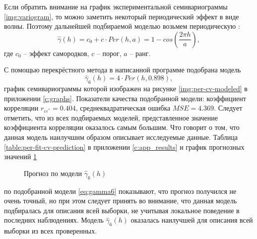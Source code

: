 Если обратить внимание на график экспериментальной семивариограммы \ref{img:variogram}, то можно заметить некоторый периодический эффект в виде волны. Поэтому дальнейшей подбираемой моделью возьмем периодическую \cite{pebesma2001gstat}:
\begin{equation}
\label{eq:per}
	\widehat{\gamma}(h) = c_0 + c \cdot Per(h, a) = 1 - cos(\frac{2 \pi h}{a}),
\end{equation}
где $ c_0 $ -- эффект самородков, $ c $ -- порог, $ a $ -- ранг.

С помощью перекрёстного метода в написанной программе подобрана модель
\begin{equation}
\label{eq:gamma6}
	\widehat{\gamma}_6(h) = 4 \cdot Per(h, 0.898),
\end{equation}
график семивариограммы которой изображен на рисунке \ref{img:per-cv-modeled} в приложении \ref{c:graphs}. Показатели качества подобранной модели: коэффициент корреляции $ r_{\varepsilon\varepsilon^{*}} = 0.404 $, среднеквадратическая ошибка $ MSE = 4.369 $. Следует отметить, что из всех подбираемых моделей, представленное значение коэффициента корреляции оказалось самым большим. Что говорит о том, что данная модель наилучшим образом описывает исследуемые данные. Таблица \ref{table:per-fit-cv-prediction} в приложении \ref{c:app_results} и график прогнозных значений \ref{img:per-cv-pred}
\begin{figure}[ht]
\caption{Прогноз по модели $ \widehat{\gamma}_6(h) $}
\label{img:per-cv-pred}
\end{figure}
по подобранной модели \eqref{eq:gamma6} показывают, что прогноз получился не очень точный, но при этом следует принять во внимание, что данная модель подбиралась для описания всей выборки, не учитывая локальное поведение в последних наблюдениях. Модель $ \widehat{\gamma}_6(h) $ оказалась наилучшей для описания всей выборки из всех проверенных.

